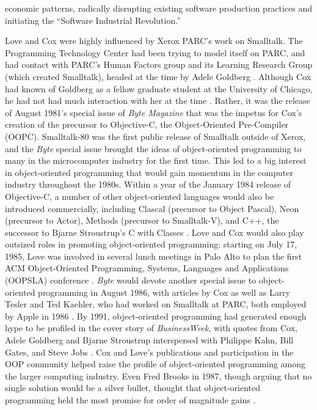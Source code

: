 \documentclass[acmsmall]{acmart}\settopmatter{}
\begin{document}
economic patterns, radically disrupting existing software production practices and initiating the ``Software Industrial Revolution.'' \citep[209--14]{cox_there_1990}

Love and Cox were highly influenced by Xerox PARC's work on Smalltalk. The Programming Technology Center had been trying to model itself on PARC, and had contact with PARC's Human Factors group and its Learning Research Group (which created Smalltalk), headed at the time by Adele Goldberg \citep{love_skype_2019}. Although Cox had known of Goldberg as a fellow graduate student at the University of Chicago, he had not had much interaction with her at the time \citep{cox_oral_2016}. Rather, it was the release of August 1981's special issue of \emph{Byte Magazine} \citep{xerox_learning_research_group_smalltalk-80_1981} that was the impetus for Cox's creation of the precursor to Objective-C, the Object-Oriented Pre-Compiler (OOPC). Smalltalk-80 was the first public release of Smalltalk outside of Xerox, and the \emph{Byte} special issue brought the ideas of object-oriented programming to many in the microcomputer industry for the first time. This led to a big interest in object-oriented programming that would gain momentum in the computer industry throughout the 1980s. Within a year of the January 1984 release of Objective-C, a number of other object-oriented languages would also be introduced commercially, including Clascal (precursor to Object Pascal), Neon (precursor to Actor), Methods (precursor to Smalltalk-V), and C++, the successor to Bjarne Stroustrup's C with Classes \citep[41]{love_object_1995}. Love and Cox would also play outsized roles in promoting object-oriented programming: starting on July 17, 1985, Love was involved in several lunch meetings in Palo Alto to plan the first ACM Object-Oriented Programming, Systems, Languages and Applications (OOPSLA) conference \citetext{\citealp[24]{love_object_1995}; \citealp{love_skype_2019}}. \emph{Byte} would devote another special issue to object-oriented programming in August 1986, with articles by Cox as well as Larry Tesler and Ted Kaehler, who had worked on Smalltalk at PARC, both employed by Apple in 1986 \citep{cox_objects_1986,kaehler_small_1986,tesler_programming_1986}. By 1991, object-oriented programming had generated enough hype to be profiled in the cover story of \emph{BusinessWeek}, with quotes from Cox, Adele Goldberg and Bjarne Stroustrup interspersed with Philippe Kahn, Bill Gates, and Steve Jobs \citep{verity_software_1991}. Cox and Love's publications and participation in the OOP community helped raise the profile of object-oriented programming among the larger computing industry. Even Fred Brooks in 1987, though arguing that no single solution would be a silver bullet, thought that object-oriented programming held the most promise for order of magnitude gains \citep[14]{brooks_no_1987}.
\end{document}
